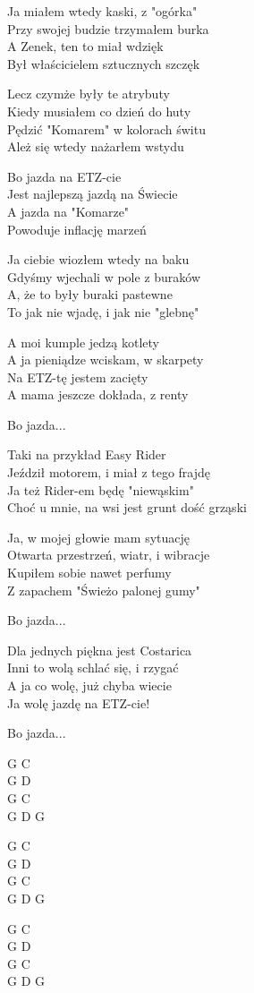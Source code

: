 \begin{text}
    Ja miałem wtedy kaski, z "ogórka"\\
    Przy swojej budzie trzymałem burka\\
    A Zenek, ten to miał wdzięk\\
    Był właścicielem sztucznych szczęk

    Lecz czymże były te atrybuty\\
    Kiedy musiałem co dzień do huty\\
    Pędzić "Komarem" w kolorach świtu\\
    Ależ się wtedy nażarłem wstydu

    \vin Bo jazda na ETZ-cie\\
    \vin Jest najlepszą jazdą na Świecie\\
    \vin A jazda na "Komarze"\\
    \vin Powoduje inflację marzeń

    Ja ciebie wiozłem wtedy na baku\\
    Gdyśmy wjechali w pole z buraków\\
    A, że to były buraki pastewne\\
    To jak nie wjadę, i jak nie "glebnę"

    A moi kumple jedzą kotlety\\
    A ja pieniądze wciskam, w skarpety\\
    Na ETZ-tę jestem zacięty\\
    A mama jeszcze dokłada, z renty

    \vin Bo jazda...

    Taki na przykład Easy Rider\\
    Jeździł motorem, i miał z tego frajdę\\
    Ja też Rider-em będę "niewąskim"\\
    Choć u mnie, na wsi jest grunt dość grząski

    Ja, w mojej głowie mam sytuację\\
    Otwarta przestrzeń, wiatr, i wibracje\\
    Kupiłem sobie nawet perfumy\\
    Z zapachem "Świeżo palonej gumy"

    \vin Bo jazda...

    Dla jednych piękna jest Costarica\\
    Inni to wolą schlać się, i rzygać\\
    A ja co wolę, już chyba wiecie\\
    Ja wolę jazdę na ETZ-cie!
	
	\vin Bo jazda...

\end{text}
\begin{chord}
    G C\\
    G D\\
    G C\\
    G D G

    G C\\
    G D\\
    G C\\
    G D G

    G C\\
    G D\\
    G C\\
    G D G
\end{chord}